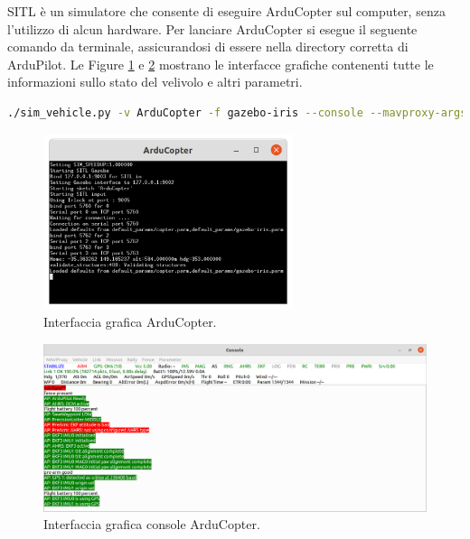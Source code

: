\ac{SITL} \cite{sitl} è un simulatore che consente di eseguire ArduCopter sul computer, senza l'utilizzo di alcun hardware. Per lanciare ArduCopter si esegue il seguente comando da terminale, assicurandosi di essere nella directory corretta di ArduPilot. Le Figure \ref{fig:arduCopter} e \ref{fig:consArduCopter} mostrano le interfacce grafiche contenenti tutte le informazioni sullo stato del velivolo e altri parametri.\\

\begin{lstlisting}[language=bash, numbers=none]
  ./sim_vehicle.py -v ArduCopter -f gazebo-iris --console --mavproxy-args="--streamrate=100"
\end{lstlisting}

\begin{figure}[H]
	\centering
	\includegraphics[width=0.65\textwidth]{gfx/ROS/ArduCopter}
	\caption[Interfaccia grafica ArduCopter.]{Interfaccia grafica ArduCopter.}
	\label{fig:arduCopter}
\end{figure}

\begin{figure}[H]
	\centering
	\includegraphics[width=1\textwidth]{gfx/ROS/SITL}
	\caption[Interfaccia grafica console ArduCopter.]{Interfaccia grafica console ArduCopter.}
	\label{fig:consArduCopter}
\end{figure}

